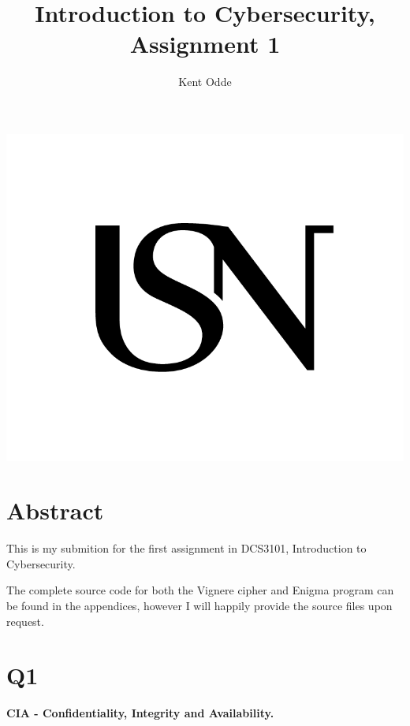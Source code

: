\documentclass{article}
\begin{document}
\author{Kent Odde}
\title{Introduction to Cybersecurity, Assignment 1}

\maketitle
\thispagestyle{empty}
\begin{center}
\includegraphics[width=\linewidth,height=0.2\textheight,keepaspectratio]{img/USN.png}
\end{center}
\newpage

\tableofcontents

\newpage

\section{Abstract}

This is my submition for the first assignment in DCS3101, Introduction to Cybersecurity. 

The complete source code for both the Vignere cipher and Enigma program can be found in the appendices, however I will happily provide the source files upon request.

\section{Q1}

\textbf{CIA - Confidentiality, Integrity and Availability.}
\end{document}
